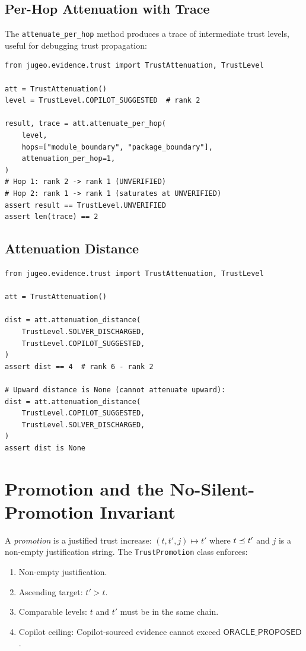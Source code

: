 \documentclass[11pt]{article}
\newcommand{\OracProp}{\mathsf{ORACLE\_PROPOSED}}
\begin{document}
\subsection{Per-Hop Attenuation with Trace}

The \texttt{attenuate\_per\_hop} method produces a trace of intermediate trust
levels, useful for debugging trust propagation:

\begin{lstlisting}[style=jugeo-python]
from jugeo.evidence.trust import TrustAttenuation, TrustLevel

att = TrustAttenuation()
level = TrustLevel.COPILOT_SUGGESTED  # rank 2

result, trace = att.attenuate_per_hop(
    level,
    hops=["module_boundary", "package_boundary"],
    attenuation_per_hop=1,
)
# Hop 1: rank 2 -> rank 1 (UNVERIFIED)
# Hop 2: rank 1 -> rank 1 (saturates at UNVERIFIED)
assert result == TrustLevel.UNVERIFIED
assert len(trace) == 2
\end{lstlisting}

\subsection{Attenuation Distance}

\begin{lstlisting}[style=jugeo-python]
from jugeo.evidence.trust import TrustAttenuation, TrustLevel

att = TrustAttenuation()

dist = att.attenuation_distance(
    TrustLevel.SOLVER_DISCHARGED,
    TrustLevel.COPILOT_SUGGESTED,
)
assert dist == 4  # rank 6 - rank 2

# Upward distance is None (cannot attenuate upward):
dist = att.attenuation_distance(
    TrustLevel.COPILOT_SUGGESTED,
    TrustLevel.SOLVER_DISCHARGED,
)
assert dist is None
\end{lstlisting}

\section{Promotion and the No-Silent-Promotion Invariant}\label{sec:promotion}

\begin{definition}\label{def:promotion}
A \emph{promotion} is a justified trust increase: $(t, t', j) \mapsto t'$
where $t \preceq t'$ and $j$ is a non-empty justification string.  The
\texttt{TrustPromotion} class enforces:
\begin{enumerate}[leftmargin=2em]
  \item Non-empty justification.
  \item Ascending target: $t' > t$.
  \item Comparable levels: $t$ and $t'$ must be in the same chain.
  \item Copilot ceiling: Copilot-sourced evidence cannot exceed $\OracProp$.
\end{enumerate}
\end{definition}
\end{document}
